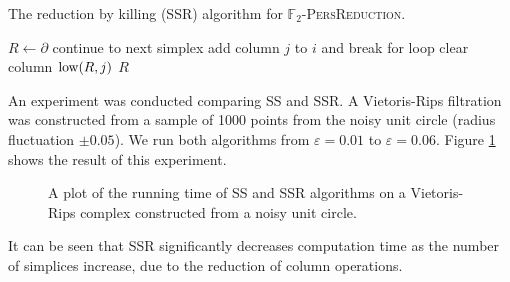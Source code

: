 \begin{algorithm}
  \caption{The reduction by killing (\textsc{SSR}) algorithm for \textsc{$\mathbb F_2$-\-Pers\-Reduc\-tion}.}
  \label{alg:reduction-by-killing}
  \begin{algorithmic}[1]
        \State $R \gets \partial$
              \State continue to next simplex
            \EndIf
                  \State add column $j$ to $i$ and break for loop
                \EndIf
              \EndFor
            \EndWhile
              \State clear column $\operatorname{low}(R, j)$
            \EndIf
          \EndFor
        \EndFor
        \State\Return $R$
      \EndFunction
  \end{algorithmic}
\end{algorithm}

An experiment was conducted comparing \textsc{SS} and \textsc{SSR}. A Vietoris-Rips filtration was constructed from a sample of 1000 points from the noisy unit circle (radius fluctuation $\pm 0.05$). We run both algorithms from $\varepsilon = 0.01$ to $\varepsilon = 0.06$. Figure \ref{fig:speedups-2v3-compute} shows the result of this experiment.

\begin{figure}
  \caption{A plot of the running time of \textsc{SS} and \textsc{SSR} algorithms on a Vietoris-Rips complex constructed from a noisy unit circle.}
  \label{fig:speedups-2v3-compute}
\end{figure}

It can be seen that \textsc{SSR} significantly decreases computation time as the number of simplices increase, due to the reduction of column operations. 
